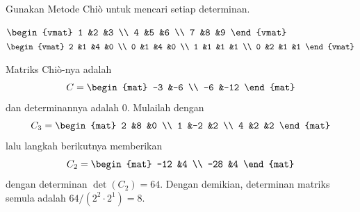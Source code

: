 \begin{exercises}
  \item 
    Gunakan Metode Chi\`o untuk mencari setiap determinan.
    \begin{exparts*}
      \partsitem 
        $
        \begin{vmat}
          1  &2  &3  \\
          4  &5  &6  \\
          7  &8  &9  
        \end{vmat}
        $
      \partsitem 
        $
        \begin{vmat}
          2  &1  &4  &0  \\
          0  &1  &4  &0  \\
          1  &1  &1  &1  \\
          0  &2  &1  &1  
        \end{vmat}
        $
    \end{exparts*}
    \begin{answer}
      \begin{exparts*}
        \partsitem Matriks Chi\`o-nya adalah
        \begin{equation*}
          C=
          \begin{mat}
            -3 &-6 \\
            -6 &-12
          \end{mat}
        \end{equation*}
        dan determinannya adalah $0$.
        \partsitem Mulailah dengan
        \begin{equation*}
          C_3=
          \begin{mat}
            2 &8  &0 \\
            1 &-2 &2 \\
            4 &2  &2
          \end{mat}
        \end{equation*}
        lalu langkah berikutnya memberikan
        \begin{equation*}
          C_2=
          \begin{mat}
            -12 &4 \\
            -28 &4
          \end{mat}
        \end{equation*}
        dengan determinan $\det(C_2)=64$.
        Dengan demikian, determinan matriks semula adalah
        $64/(2^2\cdot 2^1)=8$.
      \end{exparts*} 
    \end{answer}

\end{exercises}
